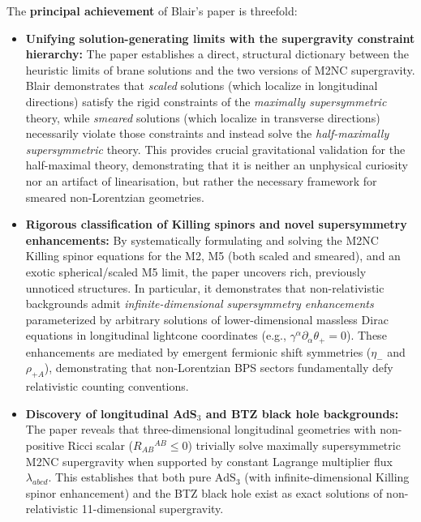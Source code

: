 \documentclass[11pt,a4paper]{article}
\begin{document}
The \textbf{principal achievement} of Blair's paper is threefold:
\begin{itemize}
    \item \textbf{Unifying solution-generating limits with the supergravity constraint hierarchy:} 
    The paper establishes a direct, structural dictionary between the heuristic limits of brane solutions and the two versions of M2NC supergravity. Blair demonstrates that \emph{scaled} solutions (which localize in longitudinal directions) satisfy the rigid constraints of the \emph{maximally supersymmetric} theory, while \emph{smeared} solutions (which localize in transverse directions) necessarily violate those constraints and instead solve the \emph{half-maximally supersymmetric} theory. This provides crucial gravitational validation for the half-maximal theory, demonstrating that it is neither an unphysical curiosity nor an artifact of linearisation, but rather the necessary framework for smeared non-Lorentzian geometries.
    
    \item \textbf{Rigorous classification of Killing spinors and novel supersymmetry enhancements:} 
    By systematically formulating and solving the M2NC Killing spinor equations for the M2, M5 (both scaled and smeared), and an exotic spherical/scaled M5 limit, the paper uncovers rich, previously unnoticed structures. In particular, it demonstrates that non-relativistic backgrounds admit \emph{infinite-dimensional supersymmetry enhancements} parameterized by arbitrary solutions of lower-dimensional massless Dirac equations in longitudinal lightcone coordinates (e.g., $\gamma^\alpha \partial_\alpha \theta_+ = 0$). These enhancements are mediated by emergent fermionic shift symmetries ($\eta_-$ and $\rho_{+A}$), demonstrating that non-Lorentzian BPS sectors fundamentally defy relativistic counting conventions.
    
    \item \textbf{Discovery of longitudinal AdS${}_3$ and BTZ black hole backgrounds:} 
    The paper reveals that three-dimensional longitudinal geometries with non-positive Ricci scalar ($R_{AB}{}^{AB} \le 0$) trivially solve maximally supersymmetric M2NC supergravity when supported by constant Lagrange multiplier flux $\lambda_{abcd}$. This establishes that both pure $\mathrm{AdS}_3$ (with infinite-dimensional Killing spinor enhancement) and the BTZ black hole exist as exact solutions of non-relativistic 11-dimensional supergravity.
\end{itemize}
\end{document}
